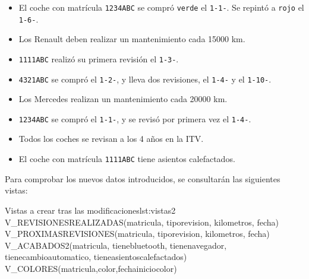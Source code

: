 \begin{homeworkProblem}

  \begin{itemize}
  \item El coche con matrícula \texttt{1234ABC} se compró \texttt{verde} el \texttt{1-1-\anio}. Se repintó a \texttt{rojo} el \texttt{1-6-\anio}.
  \item  Los Renault deben realizar un mantenimiento cada 15000 km.
    
  \item \texttt{1111ABC} realizó su primera revisión el \texttt{1-3-\anio}.
  \item \texttt{4321ABC} se compró el \texttt{1-2-\anio}, y lleva dos revisiones, el \texttt{1-4-\anio} y el \texttt{1-10-\anio}.

  \item Los Mercedes realizan un mantenimiento cada 20000 km. 
  \item \texttt{1234ABC}   se compró el \texttt{1-1-\anio}, y se revisó por primera vez el \texttt{1-4-\anio}.
  \item Todos los coches se revisan a los 4 años en la ITV.
  \item El coche con matrícula \texttt{1111ABC} tiene asientos calefactados.
  \end{itemize}

  Para comprobar los nuevos datos introducidos, se consultarán las siguientes vistas:
  
  \begin{listadosql}{Vistas a crear tras las modificaciones}{lst:vistas2}
  V_REVISIONESREALIZADAS(matricula, tiporevision, kilometros, fecha)
  V_PROXIMASREVISIONES(matricula, tiporevision, kilometros, fecha)
  V_ACABADOS2(matricula, tienebluetooth, tienenavegador, tienecambioautomatico, tieneasientoscalefactados)
  V_COLORES(matricula,color,fechainiciocolor)
  \end{listadosql}

\end{homeworkProblem}

